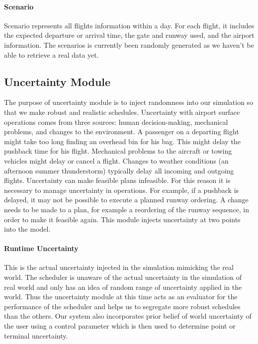 \documentclass[conference]{IEEEtran}
\begin{document}
\paragraph{Scenario}

Scenario represents all flights information within a day. For each flight, it includes the expected departure or arrival time, the gate and runway used, and the airport information. The scenarios is currently been randomly generated as we haven't be able to retrieve a real data yet.

\subsection{Uncertainty Module}

The purpose of uncertainty module is to inject randomness into our simulation so that we make robust and realistic schedules. Uncertainty with airport surface operations comes from three sources: human decision-making, mechanical problems, and changes to the environment. A passenger on a departing flight might take too long finding an overhead bin for his bag. This might delay the pushback time for his flight. Mechanical problems to the aircraft or towing vehicles might delay or cancel a flight. Changes to weather conditions (an afternoon summer thunderstorm) typically delay all incoming and outgoing flights. Uncertainty can make feasible plans infeasible. For this reason it is necessary to manage uncertainty in operations. For example, if a pushback is delayed, it may not be possible to execute a planned runway ordering. A change needs to be made to a plan, for example a reordering of the runway sequence, in order to make it feasible again. This module injects uncertainty at two points into the model.

\paragraph{Runtime Uncertainty}

This is the actual uncertainty injected in the simulation mimicking the real world. The scheduler is unaware of the actual uncertainty in the simulation of real world and only has an idea of random range of uncertainty applied in the world. Thus the uncertainty module at this time acts as an evaluator for the performance of the scheduler and helps us to segregate more robust schedules than the others. Our system also incorporates prior belief of world uncertainty of the user using a control parameter which is then used to determine point or terminal uncertainty.
\end{document}

